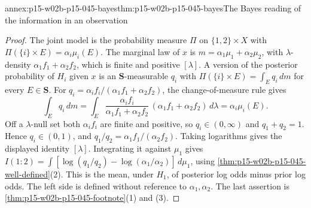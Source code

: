 \begin{annexitem}{annex:p15-w02b-p15-045-bayes}{thm:p15-w02b-p15-045-bayes}{The Bayes reading of the information in an observation}
\begin{proof}
The joint model is the probability measure \(\Pi\) on
\(\{1,2\}\times X\) with \(\Pi(\{i\}\times E)=\alpha_i\mu_i(E)\). The
marginal law of \(x\) is \(m=\alpha_1\mu_1+\alpha_2\mu_2\), with
\(\lambda\)-density \(\alpha_1f_1+\alpha_2f_2\), which is finite and
positive \([\lambda]\). A version of the posterior probability of \(H_i\)
given \(x\) is an \(\mathbf S\)-measurable \(q_i\) with
\(\Pi(\{i\}\times E)=\int_Eq_i\,dm\) for every \(E\in\mathbf S\). For
\(q_i=\alpha_if_i/(\alpha_1f_1+\alpha_2f_2)\), the change-of-measure
rule gives
\[
  \int_Eq_i\,dm=\int_E\frac{\alpha_if_i}{\alpha_1f_1+\alpha_2f_2}\,(\alpha_1f_1+\alpha_2f_2)\,d\lambda
  =\alpha_i\mu_i(E).
\]
Off a \(\lambda\)-null set both \(\alpha_if_i\) are finite and positive,
so \(q_i\in(0,\infty)\) and \(q_1+q_2=1\). Hence \(q_i\in(0,1)\), and
\(q_1/q_2=\alpha_1f_1/(\alpha_2f_2)\). Taking logarithms gives the
displayed identity \([\lambda]\). Integrating it against \(\mu_1\) gives
\(I(1:2)=\int[\log(q_1/q_2)-\log(\alpha_1/\alpha_2)]\,d\mu_1\), using
\cref{thm:p15-w02b-p15-045-well-defined}(2). This is the mean, under
\(H_1\), of posterior log odds minus prior log odds. The left side is
defined without reference to \(\alpha_1,\alpha_2\). The last assertion
is \cref{thm:p15-w02b-p15-045-footnote}(1) and (3).
\end{proof}
\end{annexitem}

